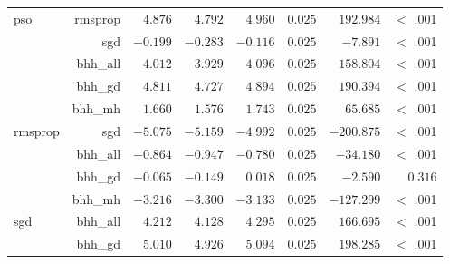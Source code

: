 \begin{table}[htb]
{\begin{tabular}{lrrrrrrr}
			pso                  & rmsprop              & $4.876$              & $4.792$                                         & $4.960$              & $0.025$              & $192.984$            & $<$ .001    \\
			$ $                  & sgd                  & $-0.199$             & $-0.283$                                        & $-0.116$             & $0.025$              & $-7.891$             & $<$ .001    \\
			                     & bhh\_all             & $4.012$              & $3.929$                                         & $4.096$              & $0.025$              & $158.804$            & $<$ .001    \\
			                     & bhh\_gd              & $4.811$              & $4.727$                                         & $4.894$              & $0.025$              & $190.394$            & $<$ .001    \\
			                     & bhh\_mh              & $1.660$              & $1.576$                                         & $1.743$              & $0.025$              & $65.685$             & $<$ .001    \\
			rmsprop              & sgd                  & $-5.075$             & $-5.159$                                        & $-4.992$             & $0.025$              & $-200.875$           & $<$ .001    \\
			$ $                  & bhh\_all             & $-0.864$             & $-0.947$                                        & $-0.780$             & $0.025$              & $-34.180$            & $<$ .001    \\
			                     & bhh\_gd              & $-0.065$             & $-0.149$                                        & $0.018$              & $0.025$              & $-2.590$             & $0.316$     \\
			                     & bhh\_mh              & $-3.216$             & $-3.300$                                        & $-3.133$             & $0.025$              & $-127.299$           & $<$ .001    \\
			sgd                  & bhh\_all             & $4.212$              & $4.128$                                         & $4.295$              & $0.025$              & $166.695$            & $<$ .001    \\
			$ $                  & bhh\_gd              & $5.010$              & $4.926$                                         & $5.094$              & $0.025$              & $198.285$            & $<$ .001    \\

\end{tabular}}
\end{table}
